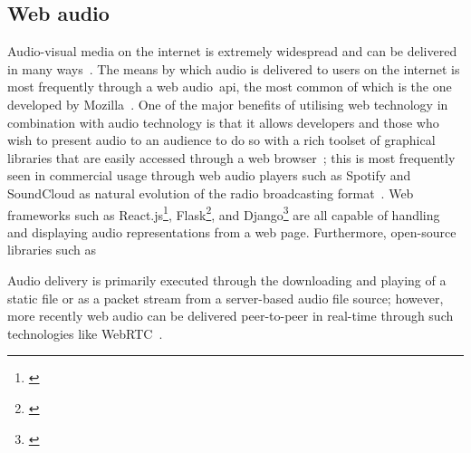 \subsection{Web audio}\label{subsec:web-audio}

Audio-visual media on the internet is extremely widespread and can be delivered in many ways~\citep{Bruegger2018}.
The means by which audio is delivered to users on the internet is most frequently through a web audio~\gls{api}, the most common of which is the one developed by Mozilla~\citep{w3c_audio_api, mdn_audio_api}.
One of the major benefits of utilising web technology in combination with audio technology is that it allows developers and those who wish to present audio to an audience to do so with a rich toolset of graphical libraries that are easily accessed through a web browser~\citep{Pauwels2018pywebaudioplayerBT};
this is most frequently seen in commercial usage through web audio players such as Spotify and SoundCloud as natural evolution of the radio broadcasting format~\citep{Bottomley2020}.
Web frameworks such as React.js\footnote{\citep{Minnick2022}}, Flask\footnote{\citep{Zhai2022}},
and Django\footnote{\citep{Pauwels2018pywebaudioplayerBT}} are all capable of handling and displaying audio representations from a web page.
Furthermore, open-source libraries such as

Audio delivery is primarily executed through the downloading and playing of a static file or as a packet stream from a server-based audio file source;
however, more recently web audio can be delivered peer-to-peer in real-time through such technologies like WebRTC~\citep{webrtc, Garcia2019}.
